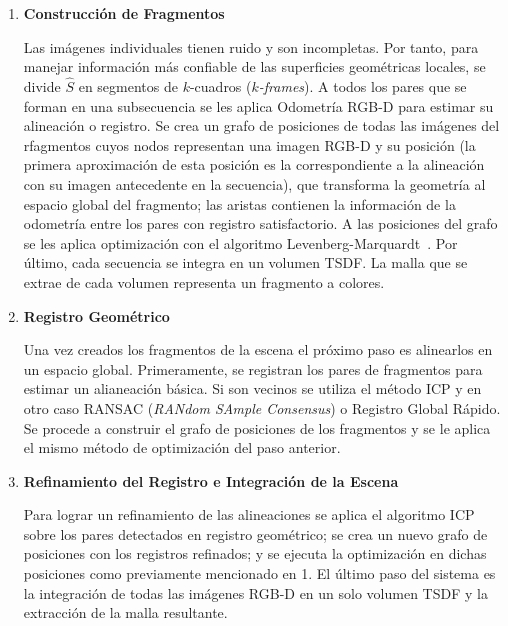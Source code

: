 \begin{enumerate}
	\item \textbf{Construcción de Fragmentos}
	
	Las imágenes individuales tienen ruido y son incompletas. Por tanto, para manejar información más confiable de las superficies geométricas locales, se divide $\hat{S}$ en segmentos de $k$-cuadros (\textit{$k$-frames}). A todos los pares que se forman en una subsecuencia se les aplica Odometría RGB-D para estimar su alineación o registro. Se crea un grafo de posiciones de todas las imágenes del rfagmentos cuyos nodos representan una imagen RGB-D  y su posición (la primera aproximación de esta posición es la correspondiente a la alineación con su imagen antecedente en la secuencia), que transforma la geometría al espacio global del fragmento; las aristas contienen la información de la odometría entre los pares con registro satisfactorio. A las posiciones del grafo se les aplica optimización con el algoritmo Levenberg-Marquardt~\cite{more1978levenberg}. Por último, cada secuencia se integra en un volumen TSDF. La malla que se extrae de cada volumen representa un fragmento a colores.
	
	\item \textbf{Registro Geométrico}
	
	Una vez creados los fragmentos de la escena el próximo paso es alinearlos en un espacio global. Primeramente, se registran los pares de  fragmentos para estimar un alianeación básica. Si son vecinos se utiliza el método ICP y en otro caso RANSAC (\textit{RANdom SAmple Consensus}) o Registro Global Rápido. Se procede a construir el grafo de posiciones de los fragmentos y se le aplica el mismo método de optimización del paso anterior.
	
	\item \textbf{Refinamiento del Registro e Integración de la Escena}
	
	Para lograr un refinamiento de las alineaciones se aplica el algoritmo ICP sobre los pares detectados en registro geométrico; se crea un nuevo grafo de posiciones con los registros refinados; y se ejecuta la optimización en dichas posiciones como previamente mencionado en 1. El último paso del sistema es la integración de todas las imágenes RGB-D en un solo volumen TSDF y la extracción de la malla resultante.
\end{enumerate}

